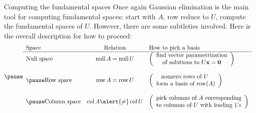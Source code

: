 \begin{frame}{Computing the fundamental spaces}
\footnotesize
Once again Gaussian elimination is the main tool for computing fundamental spaces: start with $A$, row reduce to $U$, compute the fundamental spaces of $U$. However, there are some subtleties involved. Here is the overall description for how to proceed:
\[
\pause 
\begin{array}{lcl}
\text{Space}&\text{Relation}&\text{How to pick a basis}\\
\hline
\text{Null space}&\NS A=\NS U&\left(\begin{array}{c}\text{find vector parametrization}\\ \text{of solutions to $U\boldx=\boldzero$} \end{array}\right) \\
\\
\pause\text{Row space}&\RS A=\RS U &\left(\begin{array}{c}\text{nonzero rows of $U$ }\\ \text{form a basis of $\RS(A)$} \end{array}\right) \\
\\
\pause\text{Column space}&\CS A \alert{\ne}\CS U &\left(\begin{array}{c}\text{pick columns of $A$ corresponding}\\ \text{to columns of $U$ with leading 1's} \end{array}\right) 
\end{array}
\]
\end{frame}
